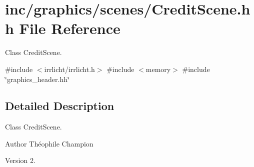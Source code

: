 \hypertarget{CreditScene_8hh}{}\section{inc/graphics/scenes/\+Credit\+Scene.hh File Reference}
\label{CreditScene_8hh}


Class Credit\+Scene.  


{\ttfamily \#include $<$irrlicht/irrlicht.\+h$>$}\newline
{\ttfamily \#include $<$memory$>$}\newline
{\ttfamily \#include \char`\"{}graphics\+\_\+header.\+hh\char`\"{}}\newline


\subsection{Detailed Description}
Class Credit\+Scene. 

\begin{DoxyAuthor}{Author}
Théophile Champion 
\end{DoxyAuthor}
\begin{DoxyVersion}{Version}
2. 
\end{DoxyVersion}
